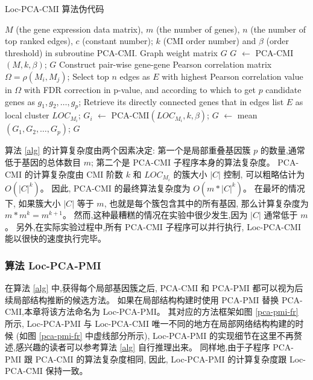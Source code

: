 \begin{algorithm}[!htbp]
    \renewcommand{\thealgorithm}{2-1}
    \caption{Loc-PCA-CMI 算法伪代码}
    \label{alg}
    \begin{algorithmic}[1]
    \Require $M$ (the gene expression data matrix), $m$ (the number of genes), $n$ (the number of top ranked edges), $c$ (constant number); $k$ (CMI order number) and $\beta$ (order threshold) in subroutine PCA-CMI.
    \Ensure Graph weight matrix $G$ 
    \State $G$ $\leftarrow$ PCA-CMI$(M, k, \beta)$;
    \State \Return $G$
    \Else
    \State Construct pair-wise gene-gene Pearson correlation matrix $\Omega = \rho(M_i, M_j)$;
    \State Select top $n$ edges as $E$ with highest Pearson correlation value in $\Omega$ with FDR correction in p-value, and according to which to get 
    $p$ candidate genes as $g_1,g_2,\ldots,g_{p}$;
      \State Retrieve its directly connected genes that in edges list $E$ as local cluster $LOC_{M_i}$;
    \EndFor
      \State $G_{i}$ $\leftarrow$ PCA-CMI$(LOC_{M_i}, k, \beta)$;
    \EndFor
    \State $G$ $\leftarrow$ mean$(G_{1},G_{2},\ldots,G_{p})$;
    \State \Return $G$ 
    \EndIf
    \end{algorithmic}
\end{algorithm}

算法 \ref{alg} 的计算复杂度由两个因素决定:
 第一个是局部重叠基因簇 $p$ 的数量,通常低于基因的总体数目 $m$; 
第二个是 PCA-CMI 子程序本身的算法复杂度。
 PCA-CMI 的计算复杂度由 CMI 阶数 $k$ 和 $LOC_{M_i}$ 的簇大小 $|C|$ 控制,
可以粗略估计为 $O(|C|^k)$。
因此, PCA-CMI 的最终算法复杂度为 $O(m *|C|^k)$。
在最坏的情况下, 如果簇大小 $|C|$ 等于 $m$, 也就是每个簇包含其中的所有基因, 
那么计算复杂度为 $m*m^k = m^{k+1}$。 
然而,这种最糟糕的情况在实验中很少发生,因为 $|C|$ 通常低于 $m$。
另外,在实际实验过程中,所有 PCA-CMI 子程序可以并行执行, Loc-PCA-CMI 能以很快的速度执行完毕。

\subsubsection{算法 Loc-PCA-PMI }

在算法 \ref{alg} 中,获得每个局部基因簇之后,
 PCA-CMI 和 PCA-PMI 都可以视为后续局部结构推断的候选方法。
如果在局部结构构建时使用 PCA-PMI 替换 PCA-CMI,本章将该方法命名为 Loc-PCA-PMI。
其对应的方法框架如图 \ref{pca-pmi-fr} 所示, 
 Loc-PCA-PMI 与 Loc-PCA-CMI 唯一不同的地方在局部网络结构构建的时候 (如图 \ref{pca-pmi-fr} 中虚线部分所示),
 Loc-PCA-PMI 的实现细节在这里不再赘述,感兴趣的读者可以参考算法 \ref{alg} 自行推理出来。
同样地,由于子程序 PCA-PMI 跟 PCA-CMI 的算法复杂度相同,
因此, Loc-PCA-PMI 的计算复杂度跟 Loc-PCA-CMI 保持一致。

